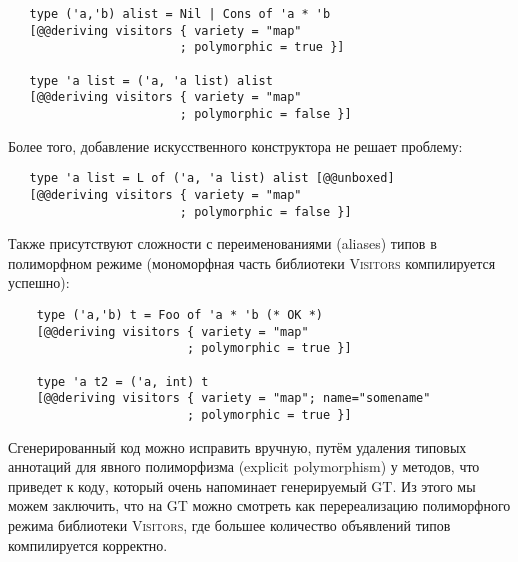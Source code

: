 \begin{itemize}
   \begin{lstlisting}
   type ('a,'b) alist = Nil | Cons of 'a * 'b
   [@@deriving visitors { variety = "map"
                        ; polymorphic = true }]

   type 'a list = ('a, 'a list) alist
   [@@deriving visitors { variety = "map"
                        ; polymorphic = false }]
   \end{lstlisting}
   
   Более того, добавление искусственного конструктора не решает проблему:
   
   \begin{lstlisting}
   type 'a list = L of ('a, 'a list) alist [@@unboxed]
   [@@deriving visitors { variety = "map"
                        ; polymorphic = false }]
   \end{lstlisting}
    
    Также присутствуют сложности с переименованиями (aliases) типов в полиморфном режиме (мономорфная часть библиотеки \textsc{Visitors} компилируется успешно):
    
    \begin{lstlisting}
    type ('a,'b) t = Foo of 'a * 'b (* OK *)
    [@@deriving visitors { variety = "map"
                         ; polymorphic = true }]

    type 'a t2 = ('a, int) t
    [@@deriving visitors { variety = "map"; name="somename"
                         ; polymorphic = true }]
    \end{lstlisting}
    
    Сгенерированный код можно исправить вручную, путём удаления типовых аннотаций для явного полиморфизма (explicit polymorphism) у методов, что приведет к коду, который очень напоминает генерируемый  \textsc{GT}. Из этого мы можем заключить, что на \textsc{GT} можно смотреть как перереализацию полиморфного режима библиотеки  \textsc{Visitors}, где большее количество объявлений типов компилируется корректно.
    
\end{itemize}
